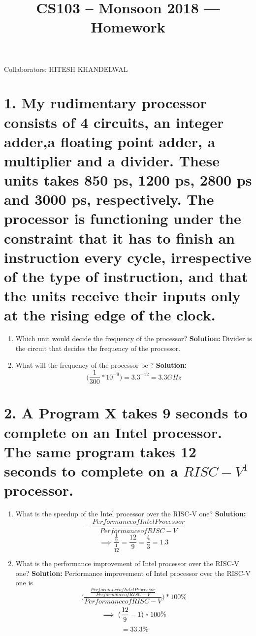 \documentclass[11pt]{article}
\title{CS103 -- Monsoon 2018 --- Homework \Homework}
\author{\Name 
}
\date{}
\newenvironment{qparts}{\begin{enumerate}[{(}a{)}]}{\end{enumerate}}
\begin{document}
\maketitle

Collaborators: HITESH KHANDELWAL

\section*{1. My rudimentary processor consists of 4 circuits, an integer adder,a floating point adder, a multiplier and a divider. These units takes 850 ps, 1200 ps, 2800 ps and 3000 ps, respectively. The processor is functioning under the constraint that it has to finish an instruction every cycle, irrespective of the type of instruction, and that the units receive their inputs only at the rising edge of the clock.
}
\begin{qparts}
\item
Which unit would decide the frequency of the processor?
\newline
\textbf{Solution: }
Divider is the circuit that decides the frequency of the processor.
\item
What will the frequency of the processor be ?
\newline
\textbf{Solution: } \[\bigg(\frac{1}{300}*10^{-9}\bigg) = 3.3^{-12} = 3.3 GHz\]

\end{qparts}

\section*{2. A Program X takes 9 seconds to complete on an Intel processor. The same program takes 12 seconds to complete on a $RISC-V^{1}$ processor.
}
\begin{qparts}
\item
What is the speedup of the Intel processor over the RISC-V one?
\newline
\textbf{Solution: }
\[= \frac{Performance of Intel Processor}{Performance of RISC-V}\]
\[\implies \frac{\frac{1}{9}}{\frac{1}{12}} = \frac{12}{9} = \frac{4}{3} = 1.3\]
\item
What is the performance improvement of Intel processor over the RISC-V one?
\newline
\textbf{Solution: } Performance improvement of Intel processor over the RISC-V one is
\[\bigg(\frac{\frac{Performance of Intel Processor}{Performance of RISC-V}}{Performance of RISC-V}\bigg) * 100\%\]
\[\implies \small(\frac{12}{9} - 1\small) * 100\% \]
\[\ = 33.3\%\]

\end{qparts}
\end{document}
